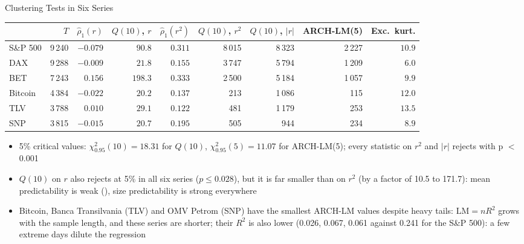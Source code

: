 \begin{frame}{Clustering Tests in Six Series}
\itemsize{\footnotesize}
\begin{center}
\scriptsize
\begin{tabular}{lrrrrrrrr}
\toprule
& $T$ & $\hat\rho_1(r)$ & $Q(10)$, $r$ & $\hat\rho_1(r^2)$ & $Q(10)$, $r^2$ & $Q(10)$, $|r|$ & ARCH-LM(5) & \textbf{Exc.\ kurt.} \\
\midrule
S\&P 500 & 9\,240 & ${-0.079}$ & $90.8$ & $0.311$ & 8\,015 & 8\,323 & 2\,227 & $10.9$ \\
DAX & 9\,288 & ${-0.009}$ & $21.8$ & $0.155$ & 3\,747 & 5\,794 & 1\,209 & $6.0$ \\
BET & 7\,243 & ${0.156}$ & $198.3$ & $0.333$ & 2\,500 & 5\,184 & 1\,057 & $9.9$ \\
Bitcoin & 4\,384 & ${-0.022}$ & $20.2$ & $0.137$ & 213 & 1\,086 & 115 & $12.0$ \\
TLV & 3\,788 & ${0.010}$ & $29.1$ & $0.122$ & 481 & 1\,179 & 253 & $13.5$ \\
SNP & 3\,815 & ${-0.015}$ & $20.7$ & $0.195$ & 505 & 944 & 234 & $8.9$ \\
\bottomrule
\end{tabular}
\end{center}
\begin{itemize}
    \item 5\% critical values: $\chi^2_{0.95}(10) = 18.31$ for $Q(10)$, $\chi^2_{0.95}(5) = 11.07$ for ARCH-LM(5); every statistic on $r^2$ and $|r|$ rejects with p $<$ 0.001
    \item $Q(10)$ on $r$ also rejects at 5\% in all six series ($p \le 0.028$), but it is far smaller than on $r^2$ (by a factor of 10.5 to 171.7): mean predictability is weak (), size predictability is strong everywhere
    \item Bitcoin, Banca Transilvania (TLV) and OMV Petrom (SNP) have the smallest ARCH-LM values despite heavy tails: $\mathrm{LM} = nR^2$ grows with the sample length, and these series are shorter; their $R^2$ is also lower (0.026, 0.067, 0.061 against 0.241 for the S\&P 500): a few extreme days dilute the regression
\end{itemize}
\end{frame}


